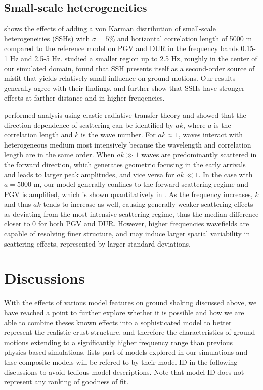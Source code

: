\subsection{Small-scale heterogeneities}
 shows the effects of adding a von Karman distribution of small-scale heterogeneities (SSHs) with $\sigma = 5\%$ and horizontal correlation length of 5000 m compared to the reference model on PGV and DUR in the frequency bands 0.15-1 Hz and 2.5-5 Hz. \citet{savranGroundMotionSimulation2019} studied a smaller region up to 2.5 Hz, roughly in the center of our simulated domain, found that SSH presents itself as a second-order source of misfit that yields relatively small influence on ground motions. Our results generally agree with their findings, and further show that SSHs have stronger effects at farther distance and in higher freuqencies.

\citet{przybillaEstimationCrustalScattering2009} performed analysis using elastic radiative transfer theory and showed that the direction dependence of scattering can be identified by $ak$, where $a$ is the correlation length and $k$ is the wave number. For $ak \approx 1$, waves interact with heterogeneous medium most intensively because the wavelength and correlation length are in the same order. When $ak\gg 1$ waves are predominantly scattered in the forward direction, which generates geometric focusing in the early arrivals and leads to larger peak amplitudes, and vice versa for $ak \ll 1$. In the case with $a=5000$ m, our model generally confines to the forward scattering regime and PGV is amplified, which is shown quantitatively in . As the frequency increases, $k$ and thus $ak$ tends to increase as well, causing generally weaker scattering effects as deviating from the most intensive scattering regime, thus the median difference closer to 0 for both PGV and DUR. However, higher frequencies wavefields are capable of resolving finer structure, and may induce larger spatial variability in scattering effects, represented by larger standard deviations.


\section{Discussions}
With the effects of various model features on ground shaking discussed above, we have reached a point to further explore whether it is possible and how we are able to combine theses known effects into a sophisticated model to better represent the realistic crust structure, and therefore the characteristics of ground motions extending to a significantly higher frequency range than previous physics-based simulations.  lists part of models explored in our simulations and thse composite models will be refered to by their model ID in the following discussions to avoid tedious model descriptions. Note that model ID does not represent any ranking of goodness of fit.


